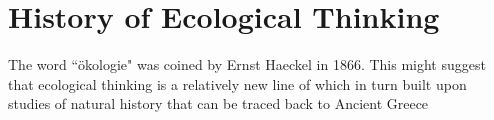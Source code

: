 \section {History of Ecological Thinking}

The word “ökologie" was coined by Ernst Haeckel in 1866. This might suggest that ecological thinking is a relatively new line of which in turn built upon studies of natural history that can be traced back to Ancient Greece
